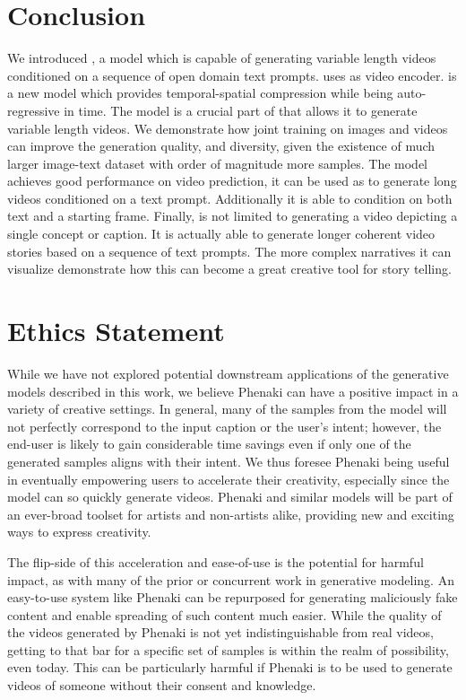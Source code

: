 \section{Conclusion}

We introduced \phenaki, a model which is capable of generating variable length videos conditioned on a sequence of open domain text prompts. \phenaki uses \cvivit as video encoder. \cvivit is a new model which provides temporal-spatial compression while being auto-regressive in time.
The \cvivit model is a crucial part of \phenaki that allows it to generate variable length videos. We demonstrate how joint training on images and videos can improve the generation quality, and diversity, given the existence of much larger image-text dataset with order of magnitude more samples. The \phenaki model achieves good performance on video prediction, it can be used as to generate long videos conditioned on a text prompt. Additionally it is able to condition on both text and a starting frame. Finally, \phenaki is not limited to generating a video depicting a single concept or caption. It is actually able to generate longer coherent video stories based on a sequence of text prompts. The more complex narratives it can visualize demonstrate how this can become a great creative tool for story telling.

\section*{Ethics Statement}
While we have not explored potential downstream applications of the generative models described in this work, we believe Phenaki can have a positive impact in a variety of creative settings. In general, many of the samples from the model will not perfectly correspond to the input caption or the user’s intent; however, the end-user is likely to gain considerable time savings even if only one of the generated samples aligns with their intent. We thus foresee Phenaki being useful in eventually empowering users to accelerate their creativity, especially since the model can so quickly generate videos. Phenaki and similar models will be part of an ever-broad toolset for artists and non-artists alike, providing new and exciting ways to express creativity.

The flip-side of this acceleration and ease-of-use is the potential for harmful impact, as with many of the prior or concurrent work in generative modeling. An easy-to-use system like Phenaki can be repurposed for generating maliciously fake content and enable spreading of such content much easier. While the quality of the videos generated by Phenaki is not yet indistinguishable from real videos, getting to that bar for a specific set of samples is within the realm of possibility, even today. This can be particularly harmful if Phenaki is to be used to generate videos of someone without their consent and knowledge.

